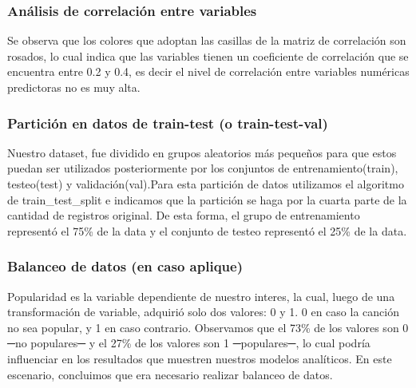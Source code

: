 \documentclass[
  letterpaper,
  DIV=11,
  numbers=noendperiod]{scrartcl}
\begin{document}
\hypertarget{anuxe1lisis-de-correlaciuxf3n-entre-variables}{%
\subsubsection{Análisis de correlación entre
variables}\label{anuxe1lisis-de-correlaciuxf3n-entre-variables}}

Se observa que los colores que adoptan las casillas de la matriz de
correlación son rosados, lo cual indica que las variables tienen un
coeficiente de correlación que se encuentra entre 0.2 y 0.4, es decir el
nivel de correlación entre variables numéricas predictoras no es muy
alta.

\hypertarget{particiuxf3n-en-datos-de-train-test-o-train-test-val}{%
\subsubsection{Partición en datos de train-test (o
train-test-val)}\label{particiuxf3n-en-datos-de-train-test-o-train-test-val}}

Nuestro dataset, fue dividido en grupos aleatorios más pequeños para que
estos puedan ser utilizados posteriormente por los conjuntos de
entrenamiento(train), testeo(test) y validación(val).Para esta partición
de datos utilizamos el algoritmo de train\_test\_split e indicamos que
la partición se haga por la cuarta parte de la cantidad de registros
original. De esta forma, el grupo de entrenamiento representó el 75\% de
la data y el conjunto de testeo representó el 25\% de la data.

\hypertarget{balanceo-de-datos-en-caso-aplique}{%
\subsubsection{Balanceo de datos (en caso
aplique)}\label{balanceo-de-datos-en-caso-aplique}}

Popularidad es la variable dependiente de nuestro interes, la cual,
luego de una transformación de variable, adquirió solo dos valores: 0 y
1. 0 en caso la canción no sea popular, y 1 en caso contrario.
Observamos que el 73\% de los valores son 0 ─no populares─ y el 27\% de
los valores son 1 ─populares─, lo cual podría influenciar en los
resultados que muestren nuestros modelos analíticos. En este escenario,
concluimos que era necesario realizar balanceo de datos.
\end{document}
